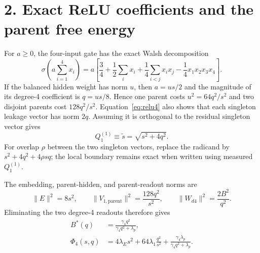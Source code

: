 \documentclass[10pt]{article}
\begin{document}
\section*{2. Exact ReLU coefficients and the parent free energy}
For $a\geq0$, the four-input gate has the exact Walsh decomposition
\begin{equation}
\sigma\!\left(a\sum_{i=1}^4x_i\right)=a\left[
\frac34+\frac12\sum_i x_i+\frac14\sum_{i<j}x_ix_j
-\frac14x_1x_2x_3x_4\right].
\label{eq:relu4}
\end{equation}
If the balanced hidden weight has norm $u$, then $a=us/2$ and the magnitude of its degree-4
coefficient is $q=us/8$.  Hence one parent costs $u^2=64q^2/s^2$ and two disjoint parents
cost $128q^2/s^2$.  Equation~\eqref{eq:relu4} also shows that each singleton leakage vector
has norm $2q$.  Assuming it is orthogonal to the residual singleton vector gives
\begin{equation}
Q_1^{(1)}\equiv \widetilde s=\sqrt{s^2+4q^2}.
\label{eq:sout}
\end{equation}
For overlap $\rho$ between the two singleton vectors, replace the radicand by
$s^2+4q^2+4\rho sq$; the local boundary remains exact when written using measured
$Q_1^{(1)}$.

The embedding, parent-hidden, and parent-readout norms are
\[
\|E\|^2=8s^2,\qquad
\|V_{1,\mathrm{parent}}\|^2=\frac{128q^2}{s^2},\qquad
\|W_{d4}\|^2=\frac{2B^2}{q^2}.
\]
Eliminating the two degree-4 readouts therefore gives
\begin{align}
B^*(q)&=\frac{\gamma_4q^2}{\gamma_4q^2+\lambda_p},\nonumber\\[-2pt]
\Phi_4(s,q)&=4\lambda_Es^2+64\lambda_1\frac{q^2}{s^2}
+\frac{\gamma_4\lambda_p}{\gamma_4q^2+\lambda_p}.
\label{eq:phi4}
\end{align}
\end{document}
